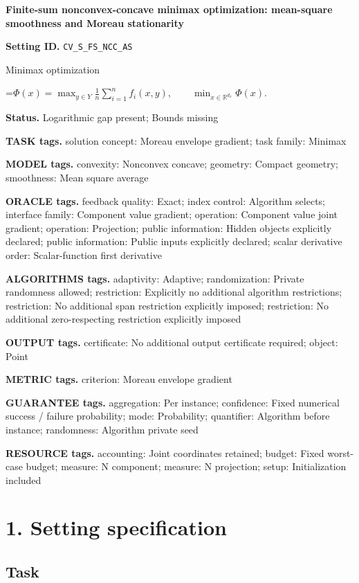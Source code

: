 \documentclass[10pt,a4paper]{article}
\newcommand{\AtlasMath}[1]{\par\begingroup\centering\setbox0=\hbox{$\displaystyle #1$}\ifdim\wd0>1.4\linewidth\typeout{ATLAS WIDE FORMULA: \the\wd0}\fi\ifdim\wd0>\linewidth\resizebox{\linewidth}{!}{\box0}\else\box0\fi\par\endgroup}
\begin{document}
\raggedright

{\LARGE\bfseries\sffamily\color{AtlasNavy} Finite-sum nonconvex-concave minimax optimization: mean-square smoothness and Moreau stationarity\par}\vspace{5pt}
\textbf{Setting ID.} \texttt{CV\_\allowbreak{}S\_\allowbreak{}FS\_\allowbreak{}NCC\_\allowbreak{}AS}

Minimax optimization


\AtlasMath{\Phi(x)=\max_{y\in Y}\frac1n\sum_{i=1}^n f_i(x,y),\qquad\min_{x\in\mathbb{R}^{d_x}}\Phi(x).}


\textbf{Status.} Logarithmic gap present; Bounds missing

\textbf{TASK tags.} solution concept: Moreau envelope gradient; task family: Minimax

\textbf{MODEL tags.} convexity: Nonconvex concave; geometry: Compact geometry; smoothness: Mean square average

\textbf{ORACLE tags.} feedback quality: Exact; index control: Algorithm selects; interface family: Component value gradient; operation: Component value joint gradient; operation: Projection; public information: Hidden objects explicitly declared; public information: Public inputs explicitly declared; scalar derivative order: Scalar-function first derivative

\textbf{ALGORITHMS tags.} adaptivity: Adaptive; randomization: Private randomness allowed; restriction: Explicitly no additional algorithm restrictions; restriction: No additional span restriction explicitly imposed; restriction: No additional zero-respecting restriction explicitly imposed

\textbf{OUTPUT tags.} certificate: No additional output certificate required; object: Point

\textbf{METRIC tags.} criterion: Moreau envelope gradient

\textbf{GUARANTEE tags.} aggregation: Per instance; confidence: Fixed numerical success / failure probability; mode: Probability; quantifier: Algorithm before instance; randomness: Algorithm private seed

\textbf{RESOURCE tags.} accounting: Joint coordinates retained; budget: Fixed worst-case budget; measure: N component; measure: N projection; setup: Initialization included

\section{1. Setting specification}
\subsection{Task}
\end{document}

